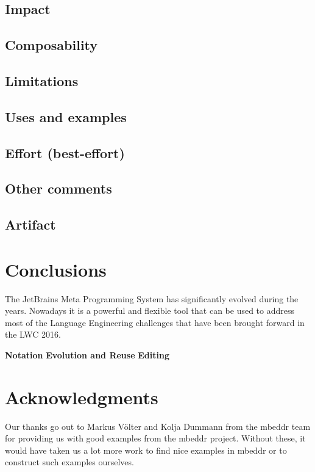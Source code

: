 \documentclass[preprint,numbers,10pt]{sigplanconf}
\begin{document}
\subsection{Impact}

\subsection{Composability}

\subsection{Limitations}

\subsection{Uses and examples}

\subsection{Effort (best-effort)}

\subsection{Other comments}

\subsection{Artifact}

%
%

\section{Conclusions}

The JetBrains Meta Programming System has significantly evolved during the years. Nowadays it is a powerful and flexible tool that can be used to address most of the Language Engineering challenges that have been brought forward in the LWC 2016.

\textbf{Notation}
\textbf{Evolution and Reuse}
\textbf{Editing}

\section{Acknowledgments}
Our thanks go out to Markus V\"olter and Kolja Dummann from the mbeddr team for providing us with good examples from the mbeddr project. Without these, it would have taken us a lot more work to find nice examples in mbeddr or to construct such examples ourselves.
\end{document}
